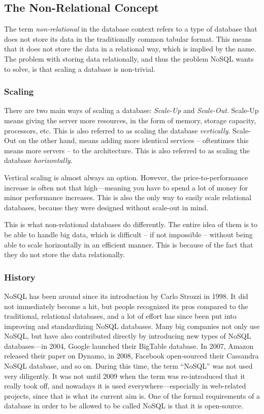 
\subsection{The Non-Relational Concept}
\label{intro-nosql-concept}
The term \emph{non-relational} in the database context refers to a type of
database that does not store its data in the traditionally common tabular
format. This means that it does not store the data in a relational way, which
is implied by the name. The problem with storing data relationally, and thus
the problem NoSQL wants to solve, is that scaling a database is non-trivial.

\subsubsection{Scaling}
\label{intro-scaling}
There are two main ways of scaling a database: \emph{Scale-Up} and
\emph{Scale-Out}. Scale-Up means giving the server more resources, in the form
of memory, storage capacity, processors, etc. This is also referred to as
scaling the database \emph{vertically}. Scale-Out on the other hand, means
adding more identical services -- oftentimes this means more servers -- to the
architecture. This is also referred to as scaling the database
\emph{horizontally}.

Vertical scaling is almost always an option. However, the price-to-performance
increase is often not that high---meaning you have to spend a lot of money for
minor performance increases. This is also the only way to easily scale
relational databases, because they were designed without scale-out in mind.

This is what non-relational databases do differently. The entire idea of them
is to be able to handle big data, which is difficult -- if not impossible --
without being able to scale horizontally in an efficient manner. This is because
of the fact that they do not store the data relationally.

\subsubsection{History}
\label{intro-history}
NoSQL has been around since its introduction by Carlo Strozzi in 1998. It did
not immediately become a hit, but people recognized its pros compared to
the traditional, relational databases, and a lot of effort has since been put
into improving and standardizing NoSQL databases. Many big companies not only
use NoSQL, but have also contributed directly by introducing new types of NoSQL
databases---in 2004, Google launched their BigTable database. In 2007, Amazon
released their paper on Dynamo, in 2008, Facebook open-sourced their Cassandra
NoSQL database, and so on. During this time, the term ``NoSQL'' was not used
very diligently. It was not until 2009 when the term was re-introduced that it
really took off, and nowadays it is used everywhere---especially in web-related
projects, since that is what its current aim is. One of the formal requirements
of a database in order to be allowed to be called NoSQL is that it is
open-source.

